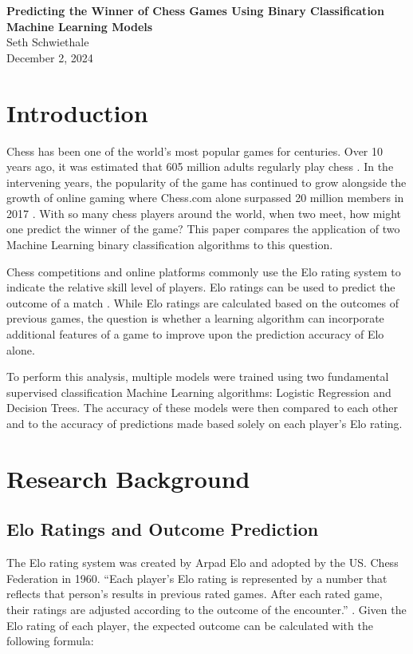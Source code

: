 \documentclass[12pt]{article}
\begin{document}
\begin{titlepage}
    \centering
    \vspace*{2in}
    {\Huge \bfseries Predicting the Winner of Chess Games Using Binary Classification Machine Learning Models \\[2in]}
    {\Large Seth Schwiethale \\[0.5in]}
    {\Large December 2, 2024 \\}
    \vfill
\end{titlepage}

\newpage
\tableofcontents
\newpage

\section{Introduction}
Chess has been one of the world's most popular games for centuries. Over 10 years ago, it was estimated that 605 million adults regularly play chess \cite{fidePressRelease2012}. In the intervening years, the popularity of the game has continued to grow alongside the growth of online gaming where Chess.com alone surpassed 20 million members in 2017 \cite{chessMembers}. With so many chess players around the world, when two meet, how might one predict the winner of the game? This paper compares the application of two Machine Learning binary classification algorithms to this question.

Chess competitions and online platforms commonly use the Elo rating system to indicate the relative skill level of players. Elo ratings can be used to predict the outcome of a match \cite{chessElo}. While Elo ratings are calculated based on the outcomes of previous games, the question is whether a learning algorithm can incorporate additional features of a game to improve upon the prediction accuracy of Elo alone.

To perform this analysis, multiple models were trained using two fundamental supervised classification Machine Learning algorithms: Logistic Regression and Decision Trees. The accuracy of these models were then compared to each other and to the accuracy of predictions made based solely on each player's Elo rating.

\section{Research Background}

\subsection{Elo Ratings and Outcome Prediction}
The Elo rating system was created by Arpad Elo and adopted by the US. Chess Federation in 1960. ``Each player's Elo rating is represented by a number that reflects that person's results in previous rated games. After each rated game, their ratings are adjusted according to the outcome of the encounter.'' \cite{chessElo}. Given the Elo rating of each player, the expected outcome can be calculated with the following formula:
\end{document}
